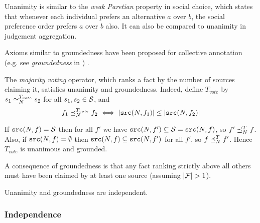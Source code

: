 \documentclass[../main.tex]{subfiles}
\begin{document}
\begin{remark}
Unanimity is similar to the \emph{weak Paretian} property\cite{handbook_intro}
in social choice, which states that whenever each individual prefers an
alternative $a$ over $b$, the social preference order prefers $a$ over $b$
also. It can also be compared to unanimity in judgement
aggregation\cite{handbook_ja}.

Axioms similar to groundedness have been proposed for collective annotation
(e.g. see \emph{groundedness} in \cite{kruger}) .
\end{remark}

\begin{example}
The \emph{majority voting} operator, which ranks a fact by the number of
sources claiming it, satisfies unanimity and groundedness. Indeed, define
$T_{vote}$ by $s_1 \seq_N^{T_{vote}} s_2$ for all $s_1, s_2 \in \S$, and
    $$ f_1 \fle_N^{T_{vote}} f_2 \iff |\src(N, f_1)| \le |\src(N, f_2)| $$

If $\src(N, f) = \S$ then for all $f'$ we have $\src(N, f') \subseteq \S =
\src(N, f)$, so $f' \fle_N^T f$. Also, if $\src(N, f) = \emptyset$ then
$\src(N, f) \subseteq \src(N, f')$ for all $f'$, so $f \fle_N^T f'$. Hence
$T_{vote}$ is unanimous and grounded.
\end{example}

A consequence of groundedness is that any fact ranking strictly above all
others must have been claimed by at least one source (assuming $|\F|>1$).

\begin{proposition}
\label{prop:unam_ground_indep}
Unanimity and groundedness are independent.
\end{proposition}

\subsubsection{Independence}

\end{document}
